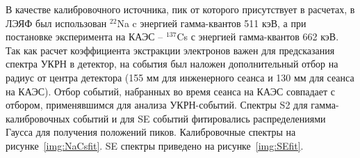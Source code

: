 В качестве калибровочного источника, пик от которого присутствует в расчетах, в ЛЭЯФ был использован $^{22}$Na c энергией гамма-квантов 511 кэВ, а при постановке эксперимента на КАЭС -- $^{137}$Cs с энергией гамма-квантов 662 кэВ. Так как расчет коэффициента экстракции электронов важен для предсказания спектра УКРН в детектор, на события был наложен дополнительный отбор на радиус от центра детектора (155 мм для инженерного сеанса и 130 мм для сеанса на КАЭС). Отбор событий, набранных во время сеанса на КАЭС совпадает с отбором, применявшимся для анализа УКРН-событий. Спектры S2 для гамма-калибровочных событий и для SE событий фитировались распределениями Гаусса для получения положений пиков. Калибровочные спектры на рисунке~\ref{img:NaCsfit}. SE спектры приведено на рисунке~\ref{img:SEfit}.

\begin{figure}[H]
  \begin{minipage}[ht]{0.49\linewidth}
  \end{minipage}
  \hfill
  \begin{minipage}[ht]{0.49\linewidth}

\end{minipage}
\end{figure}
